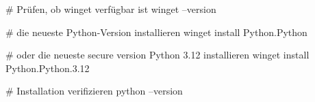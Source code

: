 # Prüfen, ob winget verfügbar ist
winget --version

# die neueste Python-Version installieren
winget install Python.Python

# oder die neueste secure version Python 3.12 installieren
winget install Python.Python.3.12

# Installation verifizieren
python --version